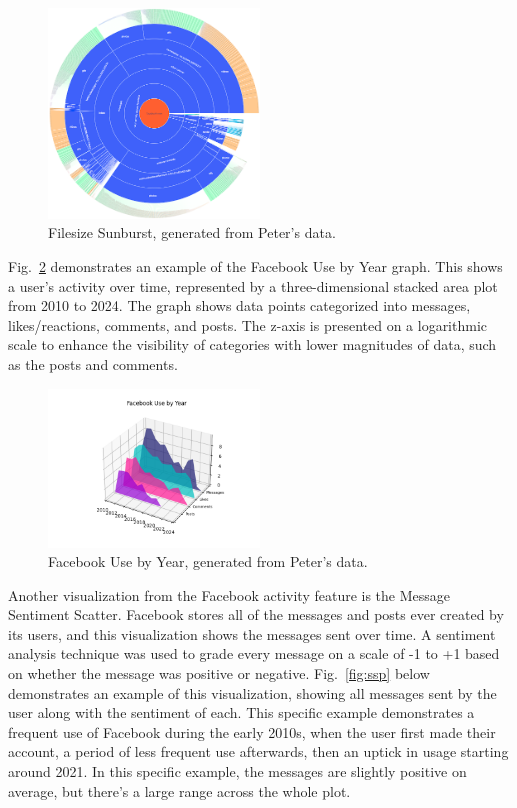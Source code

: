 \documentclass[conference, letterpaper, 11pt]{IEEEtran}
\begin{document}
\begin{figure}[htbp]
    \centering
    \includegraphics[width=0.5\textwidth]{img/fsb.png}
    \caption{Filesize Sunburst, generated from Peter's data.}
    \label{fig:fsb}
\end{figure}

Fig.~\ref{fig:fuy} demonstrates an example of the Facebook Use by Year graph. This shows a user's activity over time, represented by a three-dimensional stacked area plot from 2010 to 2024. The graph shows data points categorized into messages, likes/reactions, comments, and posts. The z-axis is presented on a logarithmic scale to enhance the visibility of categories with lower magnitudes of data, such as the posts and comments. 

\begin{figure}[htbp]
    \centering
    \includegraphics[width=0.5\textwidth]{img/fuy.png}
    \caption{Facebook Use by Year, generated from Peter's data.}
    \label{fig:fuy}
\end{figure}

Another visualization from the Facebook activity feature is the Message Sentiment Scatter. Facebook stores all of the messages and posts ever created by its users, and this visualization shows the messages sent over time. A sentiment analysis technique was used to grade every message on a scale of -1 to +1 based on whether the message was positive or negative. Fig.~\ref{fig:ssp} below demonstrates an example of this visualization, showing all messages sent by the user along with the sentiment of each. This specific example demonstrates a frequent use of Facebook during the early 2010s, when the user first made their account, a period of less frequent use afterwards, then an uptick in usage starting around 2021. In this specific example, the messages are slightly positive on average, but there's a large range across the whole plot.
\end{document}
